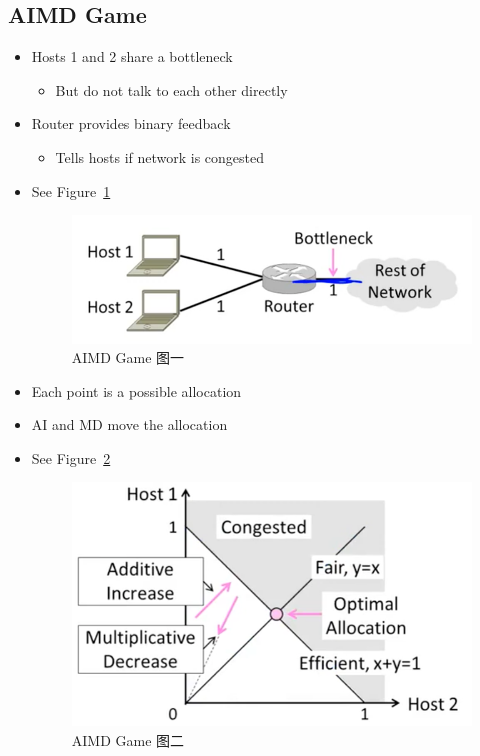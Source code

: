 \documentclass[12pt]{ctexart}   %
\begin{document}
	\subsection{AIMD Game}
	\begin{itemize}
		\item Hosts 1 and 2 share a bottleneck
		\begin{itemize}
			\item But do not talk to each other directly
		\end{itemize}
		
		\item Router provides binary feedback
		\begin{itemize}
			\item Tells hosts if network is congested
		\end{itemize}
		\item See Figure~\ref{fig:7-3-2}
		  
		 \begin{figure}[h!] %
		\centering
		 \includegraphics[scale=0.7]{images/7-3-2}
		\caption{ AIMD Game 图一}
		 \label{fig:7-3-2}
		 \end{figure}
		 
		 \item Each point is a possible allocation
		 \item AI and MD move the allocation
		 \item See Figure~\ref{fig:7-3-3}
		  
		 \begin{figure}[h!] %
		\centering
		 \includegraphics[scale=0.7]{images/7-3-3}
		\caption{ AIMD Game 图二}
		 \label{fig:7-3-3}
		 \end{figure}
		 

\end{itemize}
\end{document}
